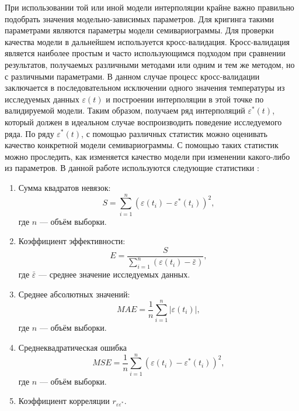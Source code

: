 При использовании той или иной модели интерполяции крайне важно правильно подобрать значения модельно-зависимых параметров. Для кригинга такими параметрами являются параметры модели семивариограммы. Для проверки качества модели в дальнейшем используется кросс-валидация. Кросс-валидация является наиболее простым и часто использующимся подходом при сравнении результатов, получаемых различными методами или одним и тем же методом, но с различными параметрами. В данном случае процесс кросс-валидации заключается в последовательном исключении одного значения температуры из исследуемых данных $ \varepsilon(t) $ и построении интерполяции в этой точке по валидируемой модели. Таким образом, получаем ряд интерполяций $ \varepsilon^{*}(t) $, который должен в идеальном случае воспроизводить поведение исследуемого ряда. По ряду $ \varepsilon^{*}(t) $, с помощью различных статистик можно оценивать качество конкретной модели семивариограммы. С помощью таких статистик можно проследить, как изменяется качество модели при изменении какого-либо из параметров. В данной работе используются следующие статистики \cite{saveliev2012}:
\begin{enumerate}
	\item Сумма квадратов невязок:
	\begin{equation*}
		S = \sum_{i = 1}^{n} (\varepsilon(t_i) - \varepsilon^{*}(t_i))^2,
	\end{equation*}
	где $ n $ --- объём выборки.
	\item Коэффициент эффективности:
	\begin{equation*}
		E = \frac{S}{\sum_{i=1}^{n}(\varepsilon(t_i) - \bar{\varepsilon})},
	\end{equation*}
	где $ \bar{\varepsilon} $ --- среднее значение исследуемых данных.
	\item Среднее абсолютных значений:
	\begin{equation*}
		MAE = \frac{1}{n} \sum_{i=1}^{n} | \varepsilon(t_i) |,
	\end{equation*}
	где $ n $ --- объём выборки.
	\item Среднеквадратическая ошибка
	\begin{equation}
	\label{eq:mse}
		MSE = \frac{1}{n} \sum_{i=1}^{n} (\varepsilon(t_i) - \varepsilon^{*}(t_i))^2,
	\end{equation}
	где $ n $ --- объём выборки.
	\item Коэффициент корреляции $ r_{\varepsilon\varepsilon^{*}}. $
\end{enumerate}

